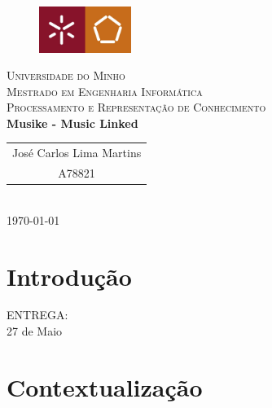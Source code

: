 \documentclass{article}
\begin{document}
{
\center
\begin{figure}[H]
        \centering
        \includegraphics[width=3cm]{Pictures/UM_EENG.jpg}
\end{figure}
\textsc{\Large Universidade do Minho} \\ [0.5cm]
\textsc{\Large Mestrado em Engenharia Informática} \\ [0.5cm]
\textsc{\large Processamento e Representação de Conhecimento} \\ [0.5cm]

{\LARGE \bfseries Musike - Music Linked} \\[0.5cm]

\begin{tabular}{c} 
    José Carlos Lima Martins \\
    A78821 \\
\end{tabular} \\[0.5cm]

\today \\[1cm]
}

\section{Introdução}

ENTREGA:\\
27 de Maio\\

\section{Contextualização}
\end{document}
